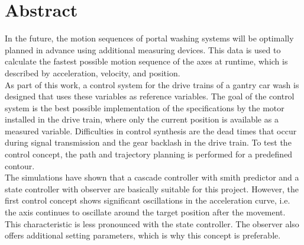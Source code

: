 \section*{Abstract}
In the future, the motion sequences of portal washing systems will be optimally planned in advance using additional measuring devices. This data is used to calculate the fastest possible motion sequence of the axes at runtime, which is described by acceleration, velocity, and position.\\
As part of this work, a control system for the drive trains of a gantry car wash is designed that uses these variables as reference variables. The goal of the control system is the best possible implementation of the specifications by the motor installed in the drive train, where only the current position is available as a measured variable.
Difficulties in control synthesis are the dead times that occur during signal transmission and the gear backlash in the drive train.
To test the control concept, the path and trajectory planning is performed for a predefined contour.\\
The simulations have shown that a cascade controller with smith predictor and a state controller with observer are basically suitable for this project. However, the first control concept shows significant oscillations in the acceleration curve, i.e. the axis continues to oscillate around the target position after the movement. This characteristic is less pronounced with the state controller. The observer also offers additional setting parameters, which is why this concept is preferable.

\singlespacing